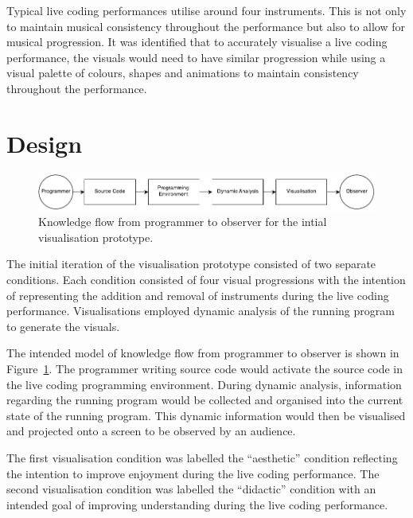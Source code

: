 
Typical live coding performances utilise around four instruments. This is not only to maintain musical consistency throughout the performance but also to allow for musical progression. It was identified that to accurately visualise a live coding performance, the visuals would need to have similar progression while using a visual palette of colours, shapes and animations to maintain consistency throughout the performance.

\section{Design}

\begin{figure}
  \centering \includegraphics[width=\columnwidth]{../images/diagrams/knowledge-flow-initial.pdf}
  \caption{Knowledge flow from programmer to observer for the intial visualisation prototype.}
\label{fig:knowledge-flow-initial}
\end{figure}

The initial iteration of the visualisation prototype consisted of two separate conditions. Each condition consisted of four visual progressions with the intention of representing the addition and removal of instruments during the live coding performance. Visualisations employed dynamic analysis of the running program to generate the visuals. 

The intended model of knowledge flow from programmer to observer is shown in Figure~\ref{fig:knowledge-flow-initial}. The programmer writing source code would activate the source code in the live coding programming environment. During dynamic analysis, information regarding the running program would be collected and organised into the current state of the running program. This dynamic information would then be visualised and projected onto a screen to be observed by an audience. 

The first visualisation condition was labelled the ``aesthetic'' condition reflecting the intention to improve enjoyment during the live coding performance. The second visualisation condition was labelled the ``didactic'' condition with an intended goal of improving understanding during the live coding performance.

